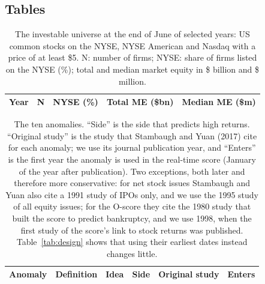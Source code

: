 \documentclass[12pt,a4paper]{article}
\begin{document}
\clearpage
\begin{singlespace}
\small
\section*{Tables}
\setcounter{topnumber}{4}\setcounter{totalnumber}{6}\renewcommand{\topfraction}{0.95}\renewcommand{\textfraction}{0.05}

\begin{table}[!htbp]\centering
\caption{The investable universe at the end of June of selected years: US common stocks on the NYSE, NYSE American and Nasdaq with a price of at least \$5. N: number of firms; NYSE: share of firms listed on the NYSE (\%); total and median market equity in \$ billion and \$ million.}\label{tab:sample}
\footnotesize
\begin{tabular}{lrrrr}\toprule
Year & N & NYSE (\%) & Total ME (\$bn) & Median ME (\$m)\\\midrule

\bottomrule\end{tabular}
\end{table}

\begin{table}[!htbp]\centering
\caption{The ten anomalies. ``Side'' is the side that predicts high returns. ``Original study'' is the study that Stambaugh and Yuan (2017) cite for each anomaly; we use its journal publication year, and ``Enters'' is the first year the anomaly is used in the real-time score (January of the year after publication). Two exceptions, both later and therefore more conservative: for net stock issues Stambaugh and Yuan also cite a 1991 study of IPOs only, and we use the 1995 study of all equity issues; for the O-score they cite the 1980 study that built the score to predict bankruptcy, and we use 1998, when the first study of the score's link to stock returns was published. Table~\ref{tab:design} shows that using their earliest dates instead changes little.}\label{tab:anomalies}
\scriptsize
\setlength{\tabcolsep}{3pt}\begin{tabular}{L{2.2cm}L{3.9cm}L{4.4cm}cL{2.4cm}c}\toprule
Anomaly & Definition & Idea & Side & Original study & Enters\\\midrule

\bottomrule\end{tabular}
\end{table}


\end{singlespace}
\end{document}
